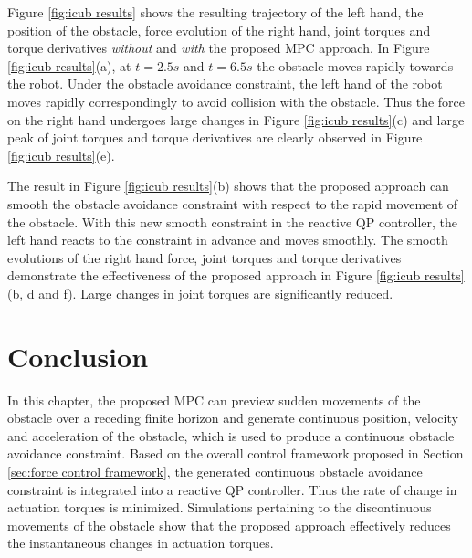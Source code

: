Figure \ref{fig:icub results} shows the resulting trajectory of the left hand, the position of the obstacle, force evolution of the right hand, joint torques and torque derivatives \textit{without} and \textit{with} the proposed MPC approach. In Figure \ref{fig:icub results}(a), at $t=2.5s$ and $t=6.5s$ the obstacle moves rapidly towards the robot. Under the obstacle avoidance constraint, the left hand of the robot moves rapidly correspondingly to avoid collision with the obstacle. Thus the force on the right hand undergoes large changes in Figure \ref{fig:icub results}(c) and large peak of joint torques and torque derivatives are clearly observed in Figure \ref{fig:icub results}(e).

The result in Figure \ref{fig:icub results}(b) shows that the proposed approach can smooth the obstacle avoidance constraint with respect to the rapid movement of the obstacle. With this new smooth constraint in the reactive QP controller, the left hand reacts to the constraint in advance and moves smoothly. The smooth evolutions of the right hand force, joint torques and torque derivatives demonstrate the effectiveness of the proposed approach in Figure \ref{fig:icub results}(b, d and f). Large changes in joint torques are significantly reduced. 




\section{Conclusion}
\label{sec:motion conclusion}

In this chapter, the proposed MPC can preview sudden movements of the obstacle over a receding finite horizon and generate continuous position, velocity and acceleration of the obstacle, which is used to produce a continuous obstacle avoidance constraint. Based on the overall control framework proposed in Section \ref{sec:force control framework}, the generated continuous obstacle avoidance constraint is integrated into a reactive QP controller. Thus the rate of change in actuation torques is minimized. Simulations pertaining to the discontinuous movements of the obstacle show that the proposed approach effectively reduces the instantaneous changes in actuation torques.